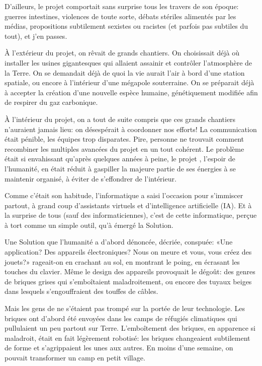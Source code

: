 D'ailleurs, le projet \nomProjet{} comportait sans surprise tous les
travers de son époque: guerres intestines, violences de toute sorte, débats
stériles alimentés par les médias, propositions
subti\-le\-ment sexistes ou racistes (et parfois pas subtiles du tout), et
j'en passes.

À l'extérieur du projet, on rêvait de grands chantiers.  On choisissait
déjà où installer les usines gigantesques qui allaient assainir et
contrô\-ler l'at\-mosphère de la Terre. On se demandait déjà de quoi la vie
aurait l'air à bord d'une station spatiale, ou encore à l'intérieur d'une
mégapole souterraine. On se préparait déjà à accepter la création d'une
nouvelle espèce humaine, génétiquement modifiée afin de respirer du gaz
carbo\-nique.

À l'intérieur du projet, on a tout de suite compris que ces grands chantiers
n'auraient jamais lieu: on désespérait à coordonner nos efforts! La
communication était pénible, les équipes trop disparates. Pire, personne ne
trouvait comment recombiner les multiples avancées du projet en un tout
cohérent.  Le problème était si envahissant qu'après quelques années à peine,
le projet \nomProjet{}, l'espoir de l'humanité, en était réduit à gaspiller la
majeure partie de ses énergies à se maintenir organisé, à éviter de s'effondrer
de l'intérieur.  

Comme c'était son habitude, l'informatique a saisi l'occasion
pour s'immiscer partout, à grand coup d'assistants virtuels et d'intelligence
artificielle (IA).  Et à la surprise de tous (sauf des informati\-ciennes),
c'est de cette informatique, perçue à tort comme un simple outil, qu'à
émergé la Solution.

Une Solution que l'humanité a d'abord dénoncée, décriée, conspuée: «Une
application? Des appareils électroniques? Nous on meure et vous, vous créez des
jouets?» rageait-on en crachant au sol, en montrant le poing, en écrasant
les touches du clavier.  Même le design des appareils provoquait le
dégoût: des genres de briques grises qui s'emboîtaient mala\-droi\-tement, ou
encore des tuyaux beiges dans lesquels s'engouffraient des touffes
de câbles.


Mais les gens de \nomProjet{} ne s'étaient pas trompé sur la portée de
leur technologie.
Les briques ont d'abord été envoyées dans les
camps de réfugiés climatiques qui pullu\-laient un peu partout sur Terre.
L'emboît\-e\-ment des briques, en apparence si maladroit,
était en fait légèrement robotisé: les briques changeaient subtilement de
forme et s'a\-grip\-paient les unes aux autres. En moins d'une semaine, on
pouvait transfor\-mer un camp en petit village.

